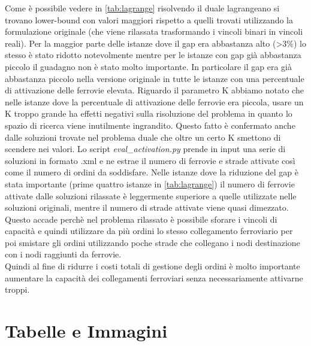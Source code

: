 \documentclass{article}
\begin{document}
Come è possibile vedere in \cref{tab:lagrange} risolvendo il duale lagrangeano si trovano lower-bound con valori maggiori rispetto a quelli trovati utilizzando la formulazione originale (che viene rilassata trasformando i vincoli binari in vincoli reali). Per la maggior parte delle istanze dove il gap era abbastanza alto (>3\%) lo stesso è stato ridotto notevolmente mentre per le istanze con gap già abbastanza piccolo il guadagno non è stato molto importante. In particolare il gap era già abbastanza piccolo nella versione originale in tutte le istanze con una percentuale di attivazione delle ferrovie elevata. Riguardo il parametro K abbiamo notato che nelle istanze dove la percentuale di attivazione delle ferrovie era piccola, usare un K troppo grande ha effetti negativi sulla risoluzione del problema in quanto lo spazio di ricerca viene inutilmente ingrandito. Questo fatto è confermato anche dalle soluzioni trovate nel problema duale che oltre un certo K smettono di scendere nei valori.
Lo script \emph{eval\_activation.py} prende in input una serie di soluzioni in formato .xml e ne estrae il numero di ferrovie e strade attivate così come il numero di ordini da soddisfare. Nelle istanze dove la riduzione del gap è stata importante (prime quattro istanze in \cref{tab:lagrange}) il numero di ferrovie attivate dalle soluzioni rilassate è leggermente superiore a quelle utilizzate nelle soluzioni originali, mentre il numero di strade attivate viene quasi dimezzato. Questo accade perchè nel problema rilassato è possibile sforare i vincoli di capacità e quindi utilizzare da più ordini lo stesso collegamento ferroviario per poi smistare gli ordini utilizzando poche strade che collegano i nodi destinazione con i nodi raggiunti da ferrovie.
\\
Quindi al fine di ridurre i costi totali di gestione degli ordini è molto importante aumentare la capacità dei collegamenti ferroviari senza necessariamente attivarne troppi.

\clearpage

\section{Tabelle e Immagini}
\label{appendice}
\end{document}
